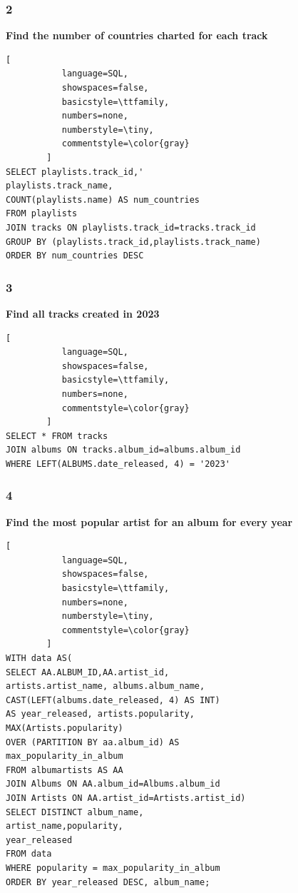 \documentclass[conference]{IEEEtran}
\begin{document}
\subsubsection*{2} \textbf{Find the number of countries charted for each track}

\begin{lstlisting}[
           language=SQL,
           showspaces=false,
           basicstyle=\ttfamily,
           numbers=none,
           numberstyle=\tiny,
           commentstyle=\color{gray}
        ]
SELECT playlists.track_id,'
playlists.track_name,
COUNT(playlists.name) AS num_countries
FROM playlists
JOIN tracks ON playlists.track_id=tracks.track_id
GROUP BY (playlists.track_id,playlists.track_name)
ORDER BY num_countries DESC
\end{lstlisting}

\subsubsection*{3} \textbf{Find all tracks created in 2023}

\begin{lstlisting}[
           language=SQL,
           showspaces=false,
           basicstyle=\ttfamily,
           numbers=none,
           commentstyle=\color{gray}
        ]
SELECT * FROM tracks
JOIN albums ON tracks.album_id=albums.album_id
WHERE LEFT(ALBUMS.date_released, 4) = '2023'
\end{lstlisting}

\subsubsection*{4} \textbf{Find the most popular artist for an album for every year}

\begin{lstlisting}[
           language=SQL,
           showspaces=false,
           basicstyle=\ttfamily,
           numbers=none,
           numberstyle=\tiny,
           commentstyle=\color{gray}
        ]
WITH data AS(
SELECT AA.ALBUM_ID,AA.artist_id,
artists.artist_name, albums.album_name, 
CAST(LEFT(albums.date_released, 4) AS INT) 
AS year_released, artists.popularity,
MAX(Artists.popularity) 
OVER (PARTITION BY aa.album_id) AS
max_popularity_in_album
FROM albumartists AS AA
JOIN Albums ON AA.album_id=Albums.album_id
JOIN Artists ON AA.artist_id=Artists.artist_id)
SELECT DISTINCT album_name, 
artist_name,popularity,
year_released
FROM data
WHERE popularity = max_popularity_in_album
ORDER BY year_released DESC, album_name;
\end{lstlisting}
\end{document}
